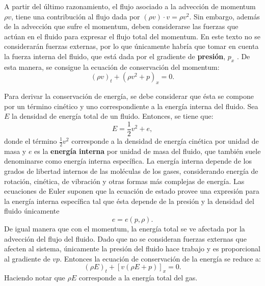 A partir del último razonamiento, el flujo asociado a la advección de momentum $\rho v$, tiene una contribución al flujo dada por $(\rho v) \cdot v = \rho v^2$. Sin embargo, además de la advección que sufre el momentum, deben considerarse las fuerzas que actúan en el fluido para expresar el flujo total del momentum. En este texto no se considerarán fuerzas externas, por lo que únicamente habría que tomar en cuenta la fuerza interna del fluido, que está dada por el gradiente de \textbf{presión}, $p_x$ \cite{LeVeque}. De esta manera, se consigue la ecuación de conservación del momentum:
\begin{equation}
	(\rho v)_t + (\rho v^{2} + p)_{x} = 0.
	\label{eq:momentum-euler}
\end{equation}

Para derivar la conservación de energía, se debe considerar que ésta se compone por un término cinético y uno correspondiente a la energía interna del fluido. Sea $E$ la densidad de energía total de un fluido. Entonces, se tiene que:
\begin{equation}
	E = \frac{1}{2} v^{2} + e,
	\label{eq:energia}
\end{equation}
donde el término $\frac{1}{2} v^{2}$ corresponde a la densidad de energía cinética por unidad de masa y $e$ es la \textbf{energía interna} por unidad de masa del fluido, que también suele denominarse como energía interna específica. La energía interna depende de los grados de libertad internos de las moléculas de los gases, considerando energía de rotación, cinética, de vibración y otras formas más complejas de energía. Las ecuaciones de Euler suponen que la ecuación de estado provee una expresión para la energía interna específica tal que ésta depende de la presión y la densidad del fluido únicamente
\begin{equation}
	e = e(p, \rho).
\end{equation}
De igual manera que con el momentum, la energía total se ve afectada por la advección del flujo del fluido. Dado que no se consideran fuerzas externas que afecten al sistema, únicamente la presión del fluido hace trabajo y es proporcional al gradiente de $vp$. Entonces la ecuación de conservación de la energía se reduce a:
\begin{equation}
	(\rho E)_{t} + [v(\rho E + p)]_{x} = 0.
	\label{eq:energia-euler}
\end{equation}
Haciendo notar que $\rho E$ corresponde a la energía total del gas.

